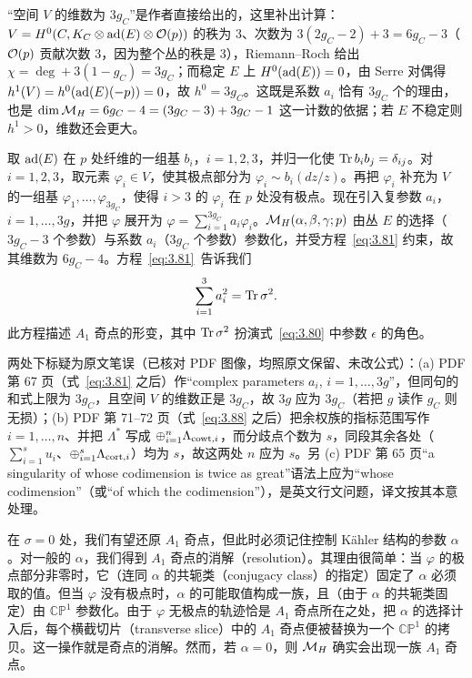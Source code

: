 \begin{yizhu}[含糊点拨]
“空间 $V$ 的维数为 $3g_C$”是作者直接给出的，这里补出计算：$V=H^0(C,K_C\otimes{\rm ad}(E)\otimes{\mathcal O}(p))$ 的秩为 $3$、次数为 $3(2g_C-2)+3=6g_C-3$（${\mathcal O}(p)$ 贡献次数 $3$，因为整个丛的秩是 $3$），Riemann--Roch 给出 $\chi=\deg+3(1-g_C)=3g_C$；而稳定 $E$ 上 $H^0({\rm ad}(E))=0$，由 Serre 对偶得 $h^1(V)=h^0({\rm ad}(E)(-p))=0$，故 $h^0=3g_C$。这既是系数 $a_i$ 恰有 $3g_C$ 个的理由，也是 $\dim{{\mathcal{M}}_H}=6g_C-4=(3g_C-3)+3g_C-1$ 这一计数的依据；若 $E$ 不稳定则 $h^1>0$，维数还会更大。
\end{yizhu}

取 ${\rm ad}(E)$ 在 $p$ 处纤维的一组基 $b_i$，$i=1,2,3$，并归一化使 ${\rm Tr}\,b_ib_j=\delta_{ij}$。对 $i=1,2,3$，取元素 $\varphi_i\in V$，使其极点部分为 $\varphi_i\sim b_i(dz/z)$。再把 $\varphi_i$ 补充为 $V$ 的一组基 $\varphi_1,\dots,\varphi_{3g_C}$，使得 $i>3$ 的 $\varphi_i$ 在 $p$ 处没有极点。现在引入复参数 $a_i$，$i=1,\dots,3g$，并把 $\varphi$ 展开为 $\varphi=\sum_{i=1}^{3g_C}a_i\varphi_i$。${{\mathcal{M}}_H}(\alpha,\beta,\gamma;p)$ 由丛 $E$ 的选择（$3g_C-3$ 个参数）与系数 $a_i$（$3g_C$ 个参数）参数化，并受方程~\eqref{eq:3.81} 约束，故其维数为 $6g_C-4$。方程~\eqref{eq:3.81}\ 告诉我们
\setcounter{equation}{81}
\begin{equation}\label{eq:3.82}
  \sum_{i=1}^3a_i^2={\rm Tr}\,\sigma^2.
\end{equation}
此方程描述 $A_1$ 奇点的形变，其中 ${\rm Tr}\,\sigma^2$ 扮演式~\eqref{eq:3.80} 中参数 $\epsilon$ 的角色。

\begin{yizhu}[原文疑误]
两处下标疑为原文笔误（已核对 PDF 图像，均照原文保留、未改公式）：(a) PDF 第 67 页（式~\eqref{eq:3.81} 之后）作“complex parameters $a_i$, $i=1,\dots,3g$”，但同句的和式上限为 $3g_C$，且空间 $V$ 的维数正是 $3g_C$，故 $3g$ 应为 $3g_C$（若把 $g$ 读作 $g_C$ 则无损）；(b) PDF 第 71--72 页（式~\eqref{eq:3.88} 之后）把余权族的指标范围写作 $i=1,\dots,n$、并把 $\Lambda^*$ 写成 $\oplus_{i=1}^n\Lambda_{{\rm cowt},i}$，而分歧点个数为 $s$，同段其余各处（$\sum_{i=1}^s u_i$、$\oplus_{i=1}^s\Lambda_{{\rm cort},i}$）均为 $s$，故这两处 $n$ 应为 $s$。另 (c) PDF 第 65 页“a singularity of whose codimension is twice as great”语法上应为“whose codimension”（或“of which the codimension”），是英文行文问题，译文按其本意处理。
\end{yizhu}

在 $\sigma=0$ 处，我们有望还原 $A_1$ 奇点，但此时必须记住控制 Kähler 结构的参数 $\alpha$。对一般的 $\alpha$，我们得到 $A_1$ 奇点的消解（resolution）。其理由很简单：当 $\varphi$ 的极点部分非零时，它（连同 $\alpha$ 的共轭类（conjugacy class）的指定）固定了 $\alpha$ 必须取的值。但当 $\varphi$ 没有极点时，$\alpha$ 的可能取值构成一族，且（由于 $\alpha$ 的共轭类固定）由 $\mathbb{CP}^1$ 参数化。由于 $\varphi$ 无极点的轨迹恰是 $A_1$ 奇点所在之处，把 $\alpha$ 的选择计入后，每个横截切片（transverse slice）中的 $A_1$ 奇点便被替换为一个 $\mathbb{CP}^1$ 的拷贝。这一操作就是奇点的消解。然而，若 $\alpha=0$，则 ${{\mathcal{M}}_H}$ 确实会出现一族 $A_1$ 奇点。

